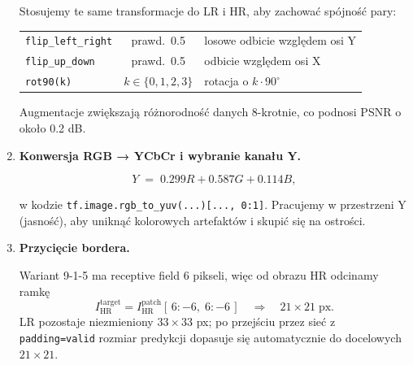 \documentclass[11pt]{article}
\begin{document}
\begin{enumerate}
Stosujemy te same transformacje do LR i HR, aby zachować spójność pary:  

\begin{center}
\begin{tabular}{lcl}
\texttt{flip\_left\_right} & prawd.\ 0.5 & losowe odbicie względem osi Y\\
\texttt{flip\_up\_down}    & prawd.\ 0.5 & odbicie względem osi X\\
\texttt{rot90(k)}          & \(k\in\{0,1,2,3\}\) & rotacja o \(k\cdot90^\circ\)
\end{tabular}
\end{center}



Augmentacje zwiększają różnorodność danych 8-krotnie, co podnosi PSNR
o około 0.2 dB.

\item \textbf{Konwersja RGB → YCbCr i wybranie kanału Y.}

\[
  Y \;=\; 0.299R + 0.587G + 0.114B,
\]

\noindent
w kodzie \texttt{tf.image.rgb\_to\_yuv(...)[...,\,0:1]}.
Pracujemy w przestrzeni Y (jasność), aby uniknąć kolorowych
artefaktów i skupić się na ostrości.

\item \textbf{Przycięcie bordera.}

Wariant 9-1-5 ma receptive field 6 pikseli,
więc od obrazu HR odcinamy ramkę
\[
  I_\mathrm{HR}^{\mathrm{target}} =
  I_\mathrm{HR}^{\mathrm{patch}}[\,6:-6,\;6:-6\,]
  \quad\Longrightarrow\quad 21\times21\;\text{px}.
\]
LR pozostaje niezmieniony \(33\times33\) px; po przejściu przez sieć z
\texttt{padding=valid} rozmiar predykcji dopasuje się automatycznie do
docelowych \(21\times21\).

\end{enumerate}

\end{document}

